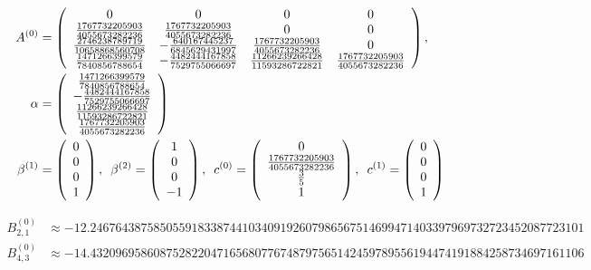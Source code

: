 \documentclass{article}
\begin{document}
\begin{align}
A^{(0)} & =\left(\begin{array}{cccc}
0 & 0 & 0 & 0\\
\frac{1767732205903}{4055673282236} & \frac{1767732205903}{4055673282236} & 0 & 0\\
\frac{2746238789719}{10658868560708} & -\frac{640167445237}{6845629431997} & \frac{1767732205903}{4055673282236} & 0\\
\frac{1471266399579}{7840856788654} & -\frac{4482444167858}{7529755066697} & \frac{11266239266428}{11593286722821} & \frac{1767732205903}{4055673282236}
\end{array}\right),\label{eq:KenCarp4}\\
\alpha & =\left(\begin{array}{c}
\frac{1471266399579}{7840856788654}\\
-\frac{4482444167858}{7529755066697}\\
\frac{11266239266428}{11593286722821}\\
\frac{1767732205903}{4055673282236}
\end{array}\right)\nonumber \\
\beta^{(1)} & =\left(\begin{array}{c}
0\\
0\\
0\\
1
\end{array}\right),\thinspace\thinspace\thinspace\beta^{(2)}=\left(\begin{array}{c}
1\\
0\\
0\\
-1
\end{array}\right),\thinspace\thinspace\thinspace c^{(0)}=\left(\begin{array}{c}
0\\
\frac{1767732205903}{4055673282236}\\
\frac{3}{5}\\
1
\end{array}\right),\,\,\,c^{(1)}=\left(\begin{array}{c}
0\\
0\\
0\\
1
\end{array}\right)\nonumber
\end{align}

{\scriptsize
\begin{align*}
B_{2,1}^{(0)} & \approx-12.246764387585055918338744103409192607986567514699471403397969732723452087723101\\
B_{4,3}^{(0)} & \approx-14.432096958608752822047165680776748797565142459789556194474191884258734697161106
\end{align*}
}%
\end{document}
